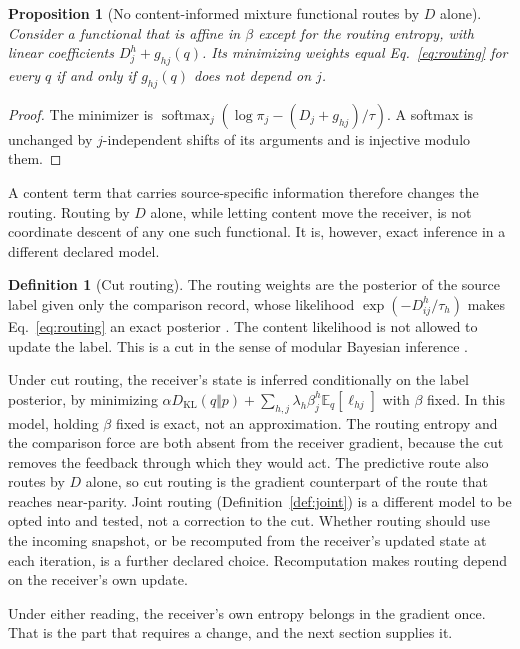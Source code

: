\documentclass[11pt]{article}
\newtheorem{proposition}{Proposition}
\theoremstyle{definition}
\newtheorem{definition}{Definition}
\theoremstyle{remark}
\newcommand{\KL}{D_{\mathrm{KL}}}
\newcommand{\softmax}{\operatorname{softmax}}
\newcommand{\E}{\mathbb{E}}
\begin{document}
\begin{proposition}[No content-informed mixture functional routes by $D$ alone]
\label{prop:no_D_only}
Consider a functional that is affine in $\beta$ except for the routing entropy, with linear coefficients $D_j^h+g_{hj}(q)$. Its minimizing weights equal Eq.~\eqref{eq:routing} for every $q$ if and only if $g_{hj}(q)$ does not depend on $j$.
\end{proposition}

\begin{proof}
The minimizer is $\softmax_j(\log\pi_j-(D_j+g_{hj})/\tau)$. A softmax is unchanged by $j$-independent shifts of its arguments and is injective modulo them.
\end{proof}

A content term that carries source-specific information therefore changes the routing. Routing by $D$ alone, while letting content move the receiver, is not coordinate descent of any one such functional. It is, however, exact inference in a different declared model.

\begin{definition}[Cut routing]
\label{def:cut}
The routing weights are the posterior of the source label given only the comparison record, whose likelihood $\exp(-D_{ij}^h/\tau_h)$ makes Eq.~\eqref{eq:routing} an exact posterior \citep{dennis2026glk}. The content likelihood is not allowed to update the label. This is a cut in the sense of modular Bayesian inference \citep{plummer2015cuts,jacob2017modules}.
\end{definition}

Under cut routing, the receiver's state is inferred conditionally on the label posterior, by minimizing $\alpha\KL(q\Vert p)+\sum_{h,j}\lambda_h\beta^h_{j}\E_q[\ell_{hj}]$ with $\beta$ fixed. In this model, holding $\beta$ fixed is exact, not an approximation. The routing entropy and the comparison force are both absent from the receiver gradient, because the cut removes the feedback through which they would act. The predictive route also routes by $D$ alone, so cut routing is the gradient counterpart of the route that reaches near-parity. Joint routing (Definition~\ref{def:joint}) is a different model to be opted into and tested, not a correction to the cut. Whether routing should use the incoming snapshot, or be recomputed from the receiver's updated state at each iteration, is a further declared choice. Recomputation makes routing depend on the receiver's own update.

Under either reading, the receiver's own entropy belongs in the gradient once. That is the part that requires a change, and the next section supplies it.
\end{document}
